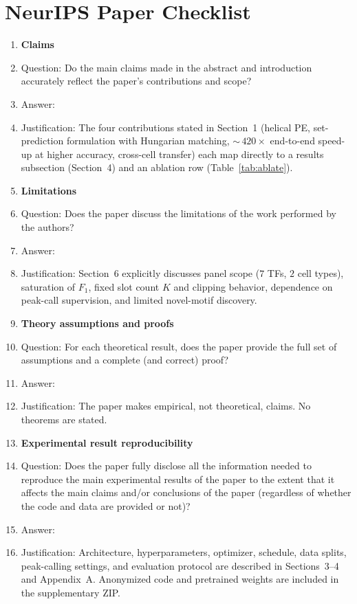 \section*{NeurIPS Paper Checklist}

\begin{enumerate}

\item {\bf Claims}
    \item[] Question: Do the main claims made in the abstract and introduction accurately reflect the paper's contributions and scope?
    \item[] Answer: \answerYes{}
    \item[] Justification: The four contributions stated in Section~1 (helical PE, set-prediction formulation with Hungarian matching, $\sim$\,$420\times$ end-to-end speed-up at higher accuracy, cross-cell transfer) each map directly to a results subsection (Section~4) and an ablation row (Table~\ref{tab:ablate}).

\item {\bf Limitations}
    \item[] Question: Does the paper discuss the limitations of the work performed by the authors?
    \item[] Answer: \answerYes{}
    \item[] Justification: Section~6 explicitly discusses panel scope ($7$ TFs, $2$ cell types), saturation of $F_1$, fixed slot count $K$ and clipping behavior, dependence on peak-call supervision, and limited novel-motif discovery.

\item {\bf Theory assumptions and proofs}
    \item[] Question: For each theoretical result, does the paper provide the full set of assumptions and a complete (and correct) proof?
    \item[] Answer: \answerNA{}
    \item[] Justification: The paper makes empirical, not theoretical, claims. No theorems are stated.

\item {\bf Experimental result reproducibility}
    \item[] Question: Does the paper fully disclose all the information needed to reproduce the main experimental results of the paper to the extent that it affects the main claims and/or conclusions of the paper (regardless of whether the code and data are provided or not)?
    \item[] Answer: \answerYes{}
    \item[] Justification: Architecture, hyperparameters, optimizer, schedule, data splits, peak-calling settings, and evaluation protocol are described in Sections~3--4 and Appendix~A. Anonymized code and pretrained weights are included in the supplementary ZIP.


\end{enumerate}
